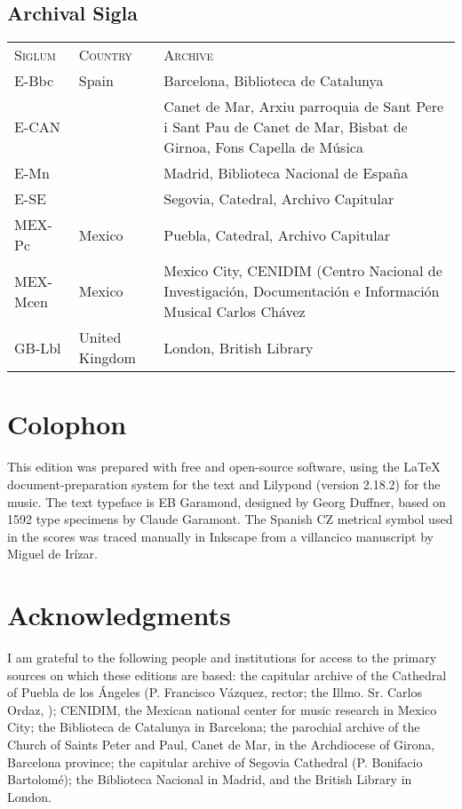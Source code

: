 \subsection{Archival Sigla}

\begin{tabu} to \textwidth{llZ}
\textsc{Siglum} & \textsc{Country} & \textsc{Archive}\\
E-Bbc & Spain & Barcelona, Biblioteca de Catalunya\\
E-CAN &  & Canet de Mar, Arxiu parroquia de Sant Pere i Sant Pau de Canet de Mar, Bisbat de Girnoa, Fons Capella de Música\\
E-Mn & &  Madrid, Biblioteca Nacional de España\\
E-SE & & Segovia, Catedral, Archivo Capitular\\
MEX-Pc & Mexico &  Puebla, Catedral, Archivo Capitular\\
MEX-Mcen & Mexico & Mexico City, CENIDIM (Centro Nacional de Investigación, Documentación e Información Musical Carlos Chávez\\
GB-Lbl & United Kingdom & London, British Library\\
\end{tabu}


\section{Colophon}

This edition was prepared with free and open-source software, using the \LaTeX{} document-preparation system for the text and Lilypond (version 2.18.2) for the music.
The text typeface is EB Garamond, designed by Georg Duffner, based on 1592 type specimens by Claude Garamont.
The Spanish CZ metrical symbol used in the scores was traced manually in Inkscape from a villancico manuscript by Miguel de Irízar.

\section{Acknowledgments}

I am grateful to the following people and institutions for access to the primary sources on which these editions are based: 
the capitular archive of the Cathedral of Puebla de los Ángeles (P. Francisco Vázquez, rector; the Illmo. Sr. Carlos Ordaz, );
CENIDIM, the Mexican national center for music research in Mexico City;
the Biblioteca de Catalunya in Barcelona;
the parochial archive of the Church of Saints Peter and Paul, Canet de Mar, in the Archdiocese of Girona, Barcelona province;
the capitular archive of Segovia Cathedral (P. Bonifacio Bartolomé);
the Biblioteca Nacional in Madrid, and
the British Library in London.

